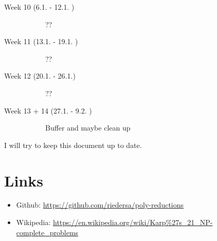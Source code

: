 \documentclass[11pt,a4paper]{scrartcl}
\begin{document}
\begin{description}
\begin{description}
		\end{description}
		\item[Week 10 (6.1. - 12.1. )]  \hfill 
		\begin{description}
			\item[\Square] ??
		\end{description}
		\item[Week 11 (13.1. - 19.1. )]  \hfill 
		\begin{description}
			\item[\Square] ??
		\end{description}
		\item[Week 12 (20.1. - 26.1.)]  \hfill 
		\begin{description}
			\item[\Square] ??
		\end{description}
		\item[Week 13 + 14 (27.1. - 9.2. )]  \hfill 
		\begin{description}
			\item[\Square] Buffer and maybe clean up
		\end{description}
	\end{description}

	I will try to keep this document up to date. 

	\section{Links}
	\begin{itemize}
		\item Github: \url{https://github.com/riedersa/poly-reductions}
		\item Wikipedia: \url{https://en.wikipedia.org/wiki/Karp\%27s_21_NP-complete_problems} 
	\end{itemize}
	
	
	
\end{document}
